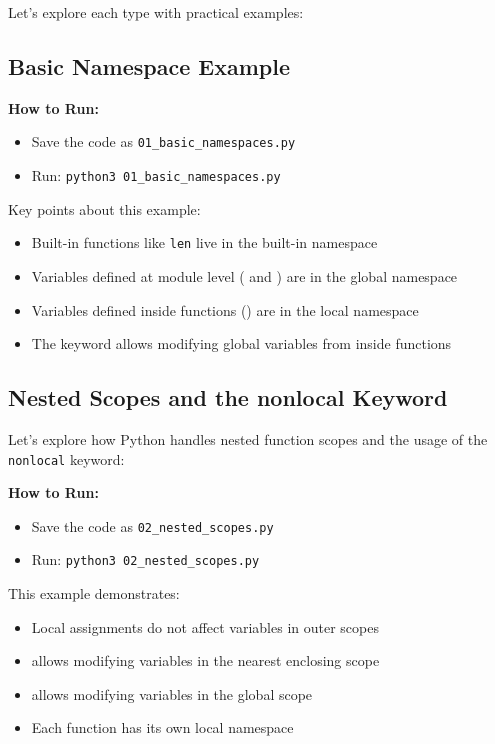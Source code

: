 Let's explore each type with practical examples:

\subsection{Basic Namespace Example}

\textbf{How to Run:}
\begin{itemize}
    \item Save the code as \verb|01_basic_namespaces.py|
    \item Run: \verb|python3 01_basic_namespaces.py|
\end{itemize}

\begin{macterminal}

\end{macterminal}

Key points about this example:
\begin{itemize}
    \item Built-in functions like \texttt{len} live in the built-in namespace
    \item Variables defined at module level ( and ) are in the global namespace
    \item Variables defined inside functions () are in the local namespace
    \item The  keyword allows modifying global variables from inside functions
\end{itemize}

\subsection{Nested Scopes and the nonlocal Keyword}

Let's explore how Python handles nested function scopes and the usage of the \texttt{nonlocal} keyword:

\textbf{How to Run:}
\begin{itemize}
    \item Save the code as \verb|02_nested_scopes.py|
    \item Run: \verb|python3 02_nested_scopes.py|
\end{itemize}

\begin{macterminal}

\end{macterminal}

This example demonstrates:
\begin{itemize}
    \item Local assignments do not affect variables in outer scopes
    \item {} allows modifying variables in the nearest enclosing scope
    \item {} allows modifying variables in the global scope
    \item Each function has its own local namespace
\end{itemize}

